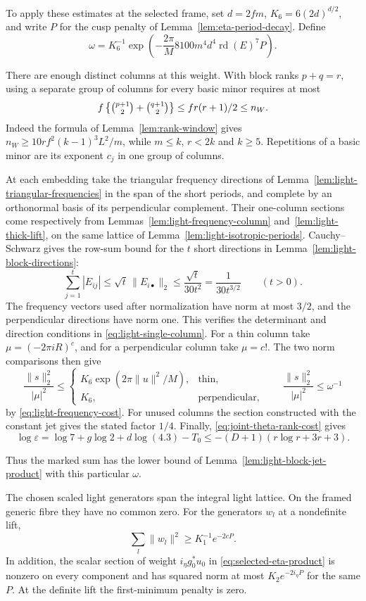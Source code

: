 To apply these estimates at the selected frame, set
\(d=2fm\), \(K_6=6(2d)^{d/2}\), and write \(P\) for the cusp
penalty of Lemma~\ref{lem:eta-period-decay}. Define
\[
 \omega=K_6^{-1}\exp\!\left(-\frac{2\pi}{M}
                 8100m^4d^4\operatorname{rd}(E)^7 P\right).
\]

There are enough distinct columns at this weight. With block ranks
\(p+q=r\), using a separate group of columns for every basic minor
requires at most
\[
 f\left\{\tbinom{p+1}2+\tbinom{q+1}2\right\}
 \le fr(r+1)/2\le n_W .
\]
Indeed the formula of Lemma~\ref{lem:rank-window} gives
\(n_W\ge10rf^2(k-1)^3L^2/m\), while \(m\le k\), \(r<2k\) and
\(k\ge5\). Repetitions of a basic minor are its exponent \(c_j\) in one
group of columns.

At each embedding take the triangular frequency directions of
Lemma~\ref{lem:light-triangular-frequencies} in the span of the short
periods, and complete by an orthonormal basis of its perpendicular
complement. Their one-column sections come respectively from
Lemmas~\ref{lem:light-frequency-column} and~\ref{lem:light-thick-lift},
on the same lattice of Lemma~\ref{lem:light-isotropic-periods}.
Cauchy--Schwarz gives the row-sum bound for the \(t\) short
directions in Lemma~\ref{lem:light-block-directions}:
\[
 \sum_{j=1}^t |E_{ij}|\le\sqrt{t}\,\|E_{i\bullet}\|_2
       \le \frac{\sqrt t}{30t^2}=\frac1{30t^{3/2}}\qquad(t>0).
\]
The frequency vectors used
after normalization have norm at most \(3/2\), and the perpendicular
directions have norm one. This verifies the determinant and
direction conditions in \eqref{eq:light-single-column}. For a thin column take \(\mu=(-2\pi iR)^c\), and for a perpendicular column take \(\mu=c!\). The two norm comparisons then give
\[
 \frac{\|s\|_2^2}{|\mu|^2}\le
 \begin{cases}
 K_6\exp(2\pi\|u\|^2/M),&\text{thin},\\
 K_6,&\text{perpendicular},
 \end{cases}
 \qquad
 \frac{\|s\|_2^2}{|\mu|^2}\le\omega^{-1}
\]
by \eqref{eq:light-frequency-cost}. For unused columns the
section constructed with the constant jet gives the stated
factor \(1/4\). Finally, \eqref{eq:joint-theta-rank-cost} gives
\[
 \log\varepsilon=\log7+g\log2+d\log(4.3)-T_0
 \le -(D+1)(r\log r+3r+3).
\]

Thus the marked sum has the lower bound of
Lemma~\ref{lem:light-block-jet-product} with this particular
\(\omega\).

\begin{lemma}
\label{lem:scaled-light-metric}
The chosen scaled light generators span the integral light lattice.
On the framed generic fibre they have no common zero. For the generators \(w_l\) at a nondefinite lift,
\[
 \sum_l\|w_l\|^2\ge K_1^{-1}e^{-2cP}.
\]
In addition,
the scalar section of weight \(i_\eta g_0^*u_0\) in
\eqref{eq:selected-eta-product} is nonzero on every component and has squared norm at most \(K_2e^{-2i_\eta P}\) for the same
\(P\). At the definite lift the first-minimum penalty is zero.
\end{lemma}

